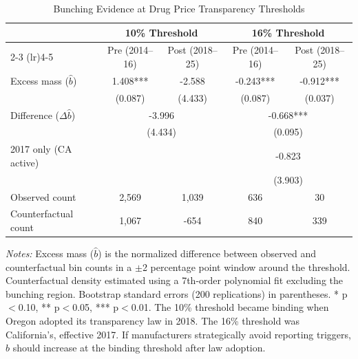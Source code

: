 \begin{table}[H]
\centering
\caption{Bunching Evidence at Drug Price Transparency Thresholds}
\begin{threeparttable}
\begin{tabular}{lcccc}
\toprule
& \multicolumn{2}{c}{10\% Threshold} & \multicolumn{2}{c}{16\% Threshold} \\
\cmidrule(lr){2-3} \cmidrule(lr){4-5}
& Pre (2014--16) & Post (2018--25) & Pre (2014--16) & Post (2018--25) \\
\midrule
Excess mass ($\hat{b}$) & 1.408*** & -2.588 & -0.243*** & -0.912*** \\
& (0.087) & (4.433) & (0.087) & (0.037) \\[0.5em]
Difference ($\Delta\hat{b}$) & \multicolumn{2}{c}{-3.996} & \multicolumn{2}{c}{-0.668***} \\
& \multicolumn{2}{c}{(4.434)} & \multicolumn{2}{c}{(0.095)} \\[0.5em]
2017 only (CA active) & & & \multicolumn{2}{c}{-0.823} \\
& & & \multicolumn{2}{c}{(3.903)} \\[0.5em]
Observed count & 2,569 & 1,039 & 636 & 30 \\
Counterfactual count & 1,067 & -654 & 840 & 339 \\
\bottomrule
\end{tabular}
\begin{tablenotes}[flushleft]
\small
\item \textit{Notes:} Excess mass ($\hat{b}$) is the normalized difference between observed and counterfactual bin counts in a $\pm$2 percentage point window around the threshold. Counterfactual density estimated using a 7th-order polynomial fit excluding the bunching region. Bootstrap standard errors (200 replications) in parentheses. * p$<$0.10, ** p$<$0.05, *** p$<$0.01. The 10\% threshold became binding when Oregon adopted its transparency law in 2018. The 16\% threshold was California's, effective 2017. If manufacturers strategically avoid reporting triggers, $\hat{b}$ should increase at the binding threshold after law adoption.
\end{tablenotes}
\end{threeparttable}
\label{tab:bunching}
\end{table}
